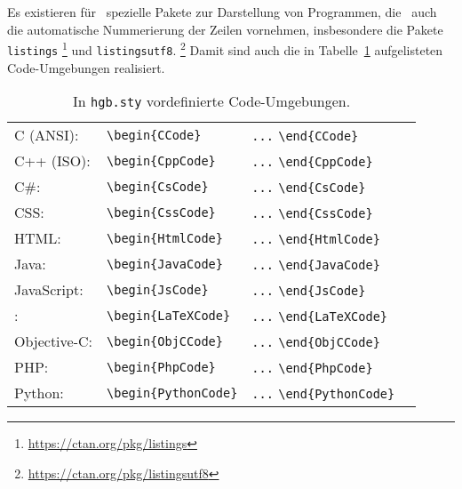 Es existieren für \latex\ spezielle Pakete zur Darstellung von Programmen, die \ua\ auch die automatische
Nummerierung der Zeilen vornehmen, insbesondere die Pakete \texttt{listings}%
\footnote{\url{https://ctan.org/pkg/listings}}
und \texttt{listingsutf8}.%
\footnote{\url{https://ctan.org/pkg/listingsutf8}}
Damit sind auch die in Tabelle~\ref{tab:CodeUmgebungen} aufgelisteten Code-Umgebungen realisiert.
%
\begin{table}
\caption{In \nolinkurl{hgb.sty} vordefinierte Code-Umgebungen.}
\label{tab:CodeUmgebungen}
\centering
\begin{tabular}{llll}
	\hline
	C (ANSI): & \verb!\begin{CCode}! & \verb!...! \verb!\end{CCode}! \\
	C++ (ISO): & \verb!\begin{CppCode}! & \verb!...! \verb!\end{CppCode}! \\
	C\#: & \verb!\begin{CsCode}! & \verb!...! \verb!\end{CsCode}! \\
	CSS: & \verb!\begin{CssCode}! & \verb!...! \verb!\end{CssCode}! \\
	HTML: & \verb!\begin{HtmlCode}! & \verb!...! \verb!\end{HtmlCode}! \\
	Java: & \verb!\begin{JavaCode}! & \verb!...! \verb!\end{JavaCode}! \\
	JavaScript: & \verb!\begin{JsCode}! & \verb!...! \verb!\end{JsCode}! \\
	\latex: & \verb!\begin{LaTeXCode}! & \verb!...! \verb!\end{LaTeXCode}! \\
	Objective-C: & \verb!\begin{ObjCCode}! & \verb!...! \verb!\end{ObjCCode}! \\
	PHP: & \verb!\begin{PhpCode}! & \verb!...! \verb!\end{PhpCode}! \\
	Python: & \verb!\begin{PythonCode}! & \verb!...! \verb!\end{PythonCode}! \\

\end{tabular}
\end{table}
